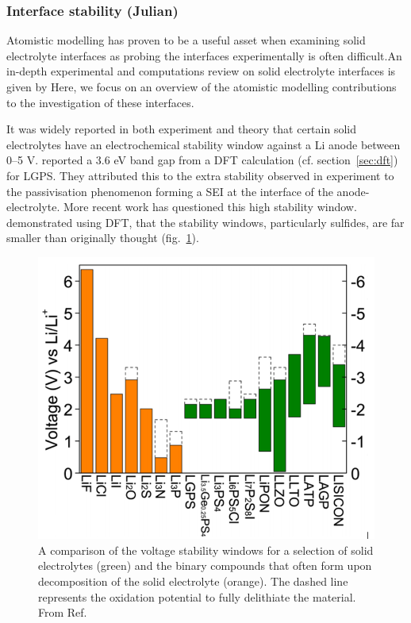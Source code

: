 \documentclass[../main.tex]{subfiles}
\begin{document}
\subsubsection{Interface stability (Julian)}
\label{sec:interface_stability}

Atomistic modelling has proven to be a useful asset when examining solid electrolyte interfaces as probing the interfaces experimentally is often difficult\cite{Xu2018exp}.An in-depth experimental and computations review on solid electrolyte interfaces is given by \citeauthor{Xiao2020interfacerev} \cite{Xiao2020interfacerev} Here, we focus on an overview of the atomistic modelling contributions to the investigation of these interfaces. 

It was widely reported in both experiment\cite{Liu2013, Han2015} and theory\cite{Mo2012} that certain solid electrolytes have an electrochemical stability window against a Li anode between 0--5 V.\cite{Kamaya2011, Thangadurai2005, Liu2013} \citeauthor{Mo2012} reported a 3.6 eV band gap from a DFT calculation (cf. section~\ref{sec:dft}) for LGPS.\cite{Mo2012} They attributed this to the extra stability observed in experiment to the passivisation phenomenon forming a SEI at the interface of the anode-electrolyte.\cite{Kobayashi2008}
More recent work has questioned this high stability window. \citeauthor{Zhu2015} demonstrated using DFT, that the stability windows, particularly sulfides, are far smaller than originally thought (fig.~\ref{fig:se_stab}).\cite{Zhu2015} 

\begin{figure}[H]
    \centering
    \includegraphics[scale=0.5]{figures/SE_voltage_stability.png}
    \caption{A comparison of the voltage stability windows for a selection of solid electrolytes (green) and the binary compounds that often form upon decomposition of the solid electrolyte (orange). The dashed line represents the oxidation potential to fully delithiate the material. From Ref. }
    \label{fig:se_stab}
\end{figure}
\end{document}
